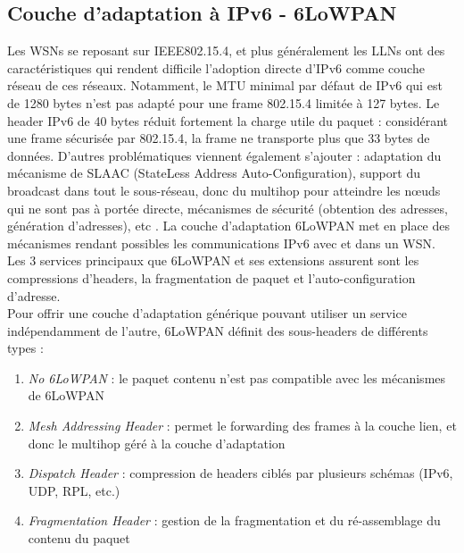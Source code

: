 \documentclass[]{report}
\begin{document}
\newpage

	\subsection{Couche d'adaptation à IPv6 - 6LoWPAN}
	\label{6LoWPAN}

\par Les WSNs se reposant sur IEEE802.15.4, et plus généralement les LLNs ont des caractéristiques qui rendent difficile l'adoption directe d'IPv6 comme couche réseau de ces réseaux. Notamment, le MTU minimal par défaut de IPv6 qui est de 1280 bytes n'est pas adapté pour une frame 802.15.4 limitée à 127 bytes. Le header IPv6 de 40 bytes réduit fortement la charge utile du paquet : considérant une frame sécurisée par 802.15.4, la frame ne transporte plus que 33 bytes de données. D'autres problématiques viennent également s'ajouter : adaptation du mécanisme de SLAAC (StateLess Address Auto-Configuration), support du broadcast dans tout le sous-réseau, donc du multihop pour atteindre les nœuds qui ne sont pas à portée directe, mécanismes de sécurité (obtention des adresses, génération d'adresses), etc \cite{rfc7554}. La couche d'adaptation 6LoWPAN met en place des mécanismes rendant possibles les communications IPv6 avec et dans un WSN. Les 3 services principaux que 6LoWPAN et ses extensions assurent sont les compressions d'headers, la fragmentation de paquet et l'auto-configuration d'adresse.\\

Pour offrir une couche d'adaptation générique pouvant utiliser un service indépendamment de l'autre, 6LoWPAN définit des sous-headers de différents types :
\vspace{0.2cm}

\begin{enumerate}
\item \textit{No 6LoWPAN} : le paquet contenu n'est pas compatible avec les mécanismes de 6LoWPAN
\vspace{0.1cm}
\item \textit{Mesh Addressing Header} : permet le forwarding des frames à la couche lien, et donc le multihop géré à la couche d'adaptation
\vspace{0.1cm}
\item \textit{Dispatch Header} : compression de headers ciblés par plusieurs schémas (IPv6, UDP, RPL, etc.)
\vspace{0.1cm}
\item \textit{Fragmentation Header} : gestion de la fragmentation et du ré-assemblage du contenu du paquet  
\end{enumerate}
\end{document}
